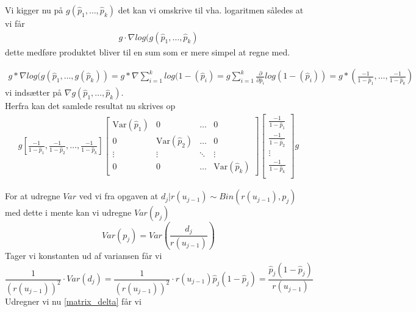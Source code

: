 Vi kigger nu på $g(\hat{p}_1,\ldots,\hat{p}_k)$ det kan vi omskrive til vha. logaritmen således at vi får 
\begin{align}
g\cdot \nabla log(g(\hat{p}_1,\ldots,\hat{p}_k)
\end{align}
dette medføre produktet bliver til en sum som er mere simpel at regne med.

\begin{align}
    g*\nabla log (g(\hat{p}_1, \dots, g(\hat{p}_k)) = g*\nabla \sum_{i=1}^k log(1-(\hat{p}_i) = g \sum_{i=1}^k \frac{\partial}{\partial \hat{p}_i} log (1-(\hat{p}_i)) = g *(\frac{-1}{1- \hat{p}_1}, \dots, \frac{-1}{1-\hat{p}_k})
\end{align}
vi indsætter på $\nabla g(\hat{p}_1, \dots, \hat{p}_k)$.\\

\noindent Herfra kan det samlede resultat nu skrives op
\begin{align}\label{matrix_delta}
g\left[\frac{-1}{1- \hat{p}_1},\frac{-1}{1- \hat{p}_2}, \dots, \frac{-1}{1-\hat{p}_k}  \right]
    \begin{bmatrix}
\text{Var}(\hat{p}_1) & 0 & \dots  & 0 \\
0 & \text{Var}(\hat{p}_2) & \dots  & 0 \\
\vdots & \vdots & \ddots & \vdots \\
0 & 0 & \dots  & \text{Var}(\hat{p}_k)
\end{bmatrix}
\begin{bmatrix}
    \frac{-1}{1- \hat{p}_1}\\
    \frac{-1}{1- \hat{p}_2}\\
    \vdots \\
    \frac{-1}{1- \hat{p}_k}\\
\end{bmatrix} g
\end{align}

\noindent For at udregne $Var$ ved vi fra opgaven at 
 $d_j|r(u_{j-1})\sim Bin(r(u_{j-1}),p_j)$ med dette i mente kan vi udregne $Var(p_j)$
\begin{equation}
    Var(p_j)=Var\left(\frac{d_j}{r(u_{j-1})}\right)
\end{equation}
Tager vi konstanten ud af variansen får vi
\begin{equation}
    \frac{1}{(r(u_{j-1}))^2}\cdot Var(d_j) =\frac{1}{(r(u_{j-1}))^2}\cdot r(u_{j-1})\hat{p}_j(1-\hat{p}_j) = \frac{\hat{p}_j(1-\hat{p}_j)}{r(u_{j-1})}
\end{equation}
\newline
Udregner vi nu \ref{matrix_delta} får vi

